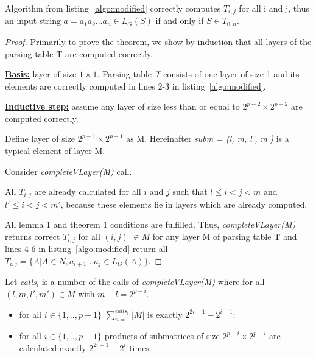 \begin{theorem}
Algorithm from listing~\ref{algo:modified} correctly computes $T_{i, j}$ for all i and j, thus an input string $a = a_{1}a_{2} \dots a_{n} \in L_{G}(S)$ if and only if $S \in T_{0, n}$.
\end{theorem}

\begin{proof}

Primarily to prove the theorem, we show by induction that all layers of the parsing table T are computed correctly.

\underline{\textbf{Basis:}} layer of size $1 \times 1$.
Parsing table \textit{T} consists of one layer of size 1 and its elements are correctly computed in lines 2-3 in listing~\ref{algo:modified}.

\underline{\textbf{Inductive step:}} assume any layer of size less than or equal to $2^{p - 2} \times 2^{p - 2}$ are computed correctly. 

Define layer of size $2^{p - 1} \times 2^{p - 1}$ as M. 
Hereinafter \textit{subm = (l, m, l', m')} is a typical element of layer M.

Consider \textit{completeVLayer(M)} call. 

All $T_{i,j}$ are already calculated for all $i$ and $j$ such that $l \leq i < j < m$ and $l' \leq i < j < m'$, because these elements lie in layers which are already computed.

All lemma 1 and theorem 1 conditions are fulfilled. Thus, \textit{completeVLayer(M)} returns correct $T_{i, j}$ for all $(i, j)$ $\in M$ for any layer M of parsing table T and lines 4-6 in listing~\ref{algo:modified} return all $T_{i, j} =  \{ A | A \in N, a_{i + 1} \dots a_{j} \in L_{G}(A)\}$.

\end{proof}

\begin{lemma}
Let \textit{calls$_{i}$} is a number of the calls of \textit{completeVLayer(M)} where for all $(l, m, l', m') \in M$ with $m - l = 2^{p - i}$.
\begin{itemize}
 \item for all $i \in \{ 1, .., p - 1\}$  $\sum_{n=1}^{calls_i}{|M|}$ is exactly $2^{2i - 1} - 2^{i - 1}$;
 \item for all $ i \in \{ 1, .., p - 1\}$ products of submatrices of size $2^{p - i} \times 2^{p - i}$ are calculated exactly $2^{2i - 1} - 2^{i}$ times.
\end{itemize}
\end{lemma}

